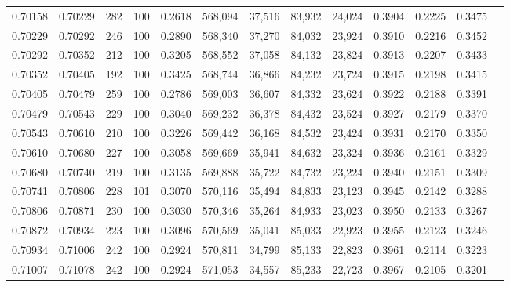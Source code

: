 \begin{tabular}{rrrrrrrrrrrrr}
0.70158 & 0.70229 &   282 & 100 &                                     0.2618 & 568,094 &  37,516 &  83,932 &  24,024 & 0.3904 & 0.2225 & 0.3475 \\
0.70229 & 0.70292 &   246 & 100 &                                     0.2890 & 568,340 &  37,270 &  84,032 &  23,924 & 0.3910 & 0.2216 & 0.3452 \\
0.70292 & 0.70352 &   212 & 100 &                                     0.3205 & 568,552 &  37,058 &  84,132 &  23,824 & 0.3913 & 0.2207 & 0.3433 \\
0.70352 & 0.70405 &   192 & 100 &                                     0.3425 & 568,744 &  36,866 &  84,232 &  23,724 & 0.3915 & 0.2198 & 0.3415 \\
0.70405 & 0.70479 &   259 & 100 &                                     0.2786 & 569,003 &  36,607 &  84,332 &  23,624 & 0.3922 & 0.2188 & 0.3391 \\
0.70479 & 0.70543 &   229 & 100 &                                     0.3040 & 569,232 &  36,378 &  84,432 &  23,524 & 0.3927 & 0.2179 & 0.3370 \\
0.70543 & 0.70610 &   210 & 100 &                                     0.3226 & 569,442 &  36,168 &  84,532 &  23,424 & 0.3931 & 0.2170 & 0.3350 \\
0.70610 & 0.70680 &   227 & 100 &                                     0.3058 & 569,669 &  35,941 &  84,632 &  23,324 & 0.3936 & 0.2161 & 0.3329 \\
0.70680 & 0.70740 &   219 & 100 &                                     0.3135 & 569,888 &  35,722 &  84,732 &  23,224 & 0.3940 & 0.2151 & 0.3309 \\
0.70741 & 0.70806 &   228 & 101 &                                     0.3070 & 570,116 &  35,494 &  84,833 &  23,123 & 0.3945 & 0.2142 & 0.3288 \\
0.70806 & 0.70871 &   230 & 100 &                                     0.3030 & 570,346 &  35,264 &  84,933 &  23,023 & 0.3950 & 0.2133 & 0.3267 \\
0.70872 & 0.70934 &   223 & 100 &                                     0.3096 & 570,569 &  35,041 &  85,033 &  22,923 & 0.3955 & 0.2123 & 0.3246 \\
0.70934 & 0.71006 &   242 & 100 &                                     0.2924 & 570,811 &  34,799 &  85,133 &  22,823 & 0.3961 & 0.2114 & 0.3223 \\
0.71007 & 0.71078 &   242 & 100 &                                     0.2924 & 571,053 &  34,557 &  85,233 &  22,723 & 0.3967 & 0.2105 & 0.3201 \\

\end{tabular}

